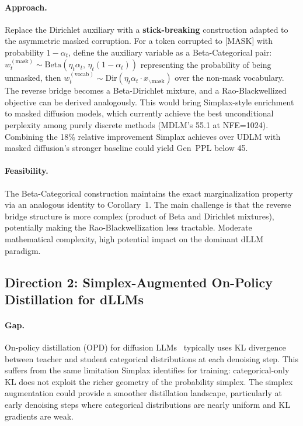 \documentclass[11pt,a4paper]{article}
\begin{document}
\paragraph{Approach.} Replace the Dirichlet auxiliary with a \textbf{stick-breaking} construction adapted to the asymmetric masked corruption. For a token corrupted to [MASK] with probability $1 - \alpha_t$, define the auxiliary variable as a Beta-Categorical pair: $w_t^{(\text{mask})} \sim \text{Beta}(\eta_t \alpha_t,\, \eta_t(1-\alpha_t))$ representing the probability of being unmasked, then $w_t^{(\text{vocab})} \sim \text{Dir}(\eta_t \alpha_t \cdot x_{\backslash\text{mask}})$ over the non-mask vocabulary. The reverse bridge becomes a Beta-Dirichlet mixture, and a Rao-Blackwellized objective can be derived analogously. This would bring Simplax-style enrichment to masked diffusion models, which currently achieve the best unconditional perplexity among purely discrete methods (MDLM's 55.1 at NFE=1024). Combining the 18\% relative improvement Simplax achieves over UDLM with masked diffusion's stronger baseline could yield Gen~PPL below 45.

\paragraph{Feasibility.} The Beta-Categorical construction maintains the exact marginalization property via an analogous identity to Corollary~1. The main challenge is that the reverse bridge structure is more complex (product of Beta and Dirichlet mixtures), potentially making the Rao-Blackwellization less tractable. Moderate mathematical complexity, high potential impact on the dominant dLLM paradigm.

\subsection{Direction 2: Simplex-Augmented On-Policy Distillation for dLLMs}

\paragraph{Gap.} On-policy distillation (OPD) for diffusion LLMs~\cite{dataeff2026} typically uses KL divergence between teacher and student categorical distributions at each denoising step. This suffers from the same limitation Simplax identifies for training: categorical-only KL does not exploit the richer geometry of the probability simplex. The simplex augmentation could provide a smoother distillation landscape, particularly at early denoising steps where categorical distributions are nearly uniform and KL gradients are weak.
\end{document}
